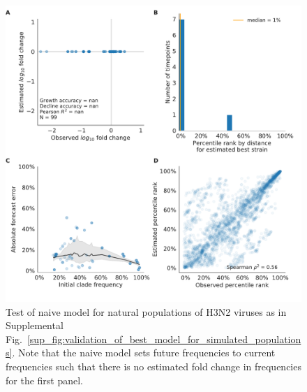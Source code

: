 \begin{figure}[H]
  \begin{center}
  \includegraphics[width=\textwidth]{figures/validation_figure_natural-natural_sample_1_with_90_vpm_sliding_test_tree-naive.pdf}
  \caption{
  Test of naive model for natural populations of H3N2 viruses as in Supplemental Fig.~\ref{sup_fig:validation_of_best_model_for_simulated_populations}.
  Note that the naive model sets future frequencies to current frequencies such that there is no estimated fold change in frequencies for the first panel.
  }
  \label{sup_fig:test_of_naive_model_for_natural_populations}
  \end{center}
\end{figure}

